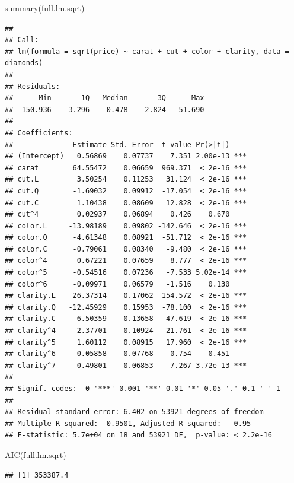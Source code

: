 \documentclass[
]{book}
\newenvironment{Shaded}{\begin{snugshade}}{\end{snugshade}}
\newcommand{\FunctionTok}[1]{\textcolor[rgb]{0.00,0.00,0.00}{#1}}
\newcommand{\NormalTok}[1]{#1}
\begin{document}
\begin{Shaded}
\begin{Highlighting}[]
\FunctionTok{summary}\NormalTok{(full.lm.sqrt)}
\end{Highlighting}
\end{Shaded}

\begin{verbatim}
## 
## Call:
## lm(formula = sqrt(price) ~ carat + cut + color + clarity, data = diamonds)
## 
## Residuals:
##      Min       1Q   Median       3Q      Max 
## -150.936   -3.296   -0.478    2.824   51.690 
## 
## Coefficients:
##              Estimate Std. Error  t value Pr(>|t|)    
## (Intercept)   0.56869    0.07737    7.351 2.00e-13 ***
## carat        64.55472    0.06659  969.371  < 2e-16 ***
## cut.L         3.50254    0.11253   31.124  < 2e-16 ***
## cut.Q        -1.69032    0.09912  -17.054  < 2e-16 ***
## cut.C         1.10438    0.08609   12.828  < 2e-16 ***
## cut^4         0.02937    0.06894    0.426    0.670    
## color.L     -13.98189    0.09802 -142.646  < 2e-16 ***
## color.Q      -4.61348    0.08921  -51.712  < 2e-16 ***
## color.C      -0.79061    0.08340   -9.480  < 2e-16 ***
## color^4       0.67221    0.07659    8.777  < 2e-16 ***
## color^5      -0.54516    0.07236   -7.533 5.02e-14 ***
## color^6      -0.09971    0.06579   -1.516    0.130    
## clarity.L    26.37314    0.17062  154.572  < 2e-16 ***
## clarity.Q   -12.45929    0.15953  -78.100  < 2e-16 ***
## clarity.C     6.50359    0.13658   47.619  < 2e-16 ***
## clarity^4    -2.37701    0.10924  -21.761  < 2e-16 ***
## clarity^5     1.60112    0.08915   17.960  < 2e-16 ***
## clarity^6     0.05858    0.07768    0.754    0.451    
## clarity^7     0.49801    0.06853    7.267 3.72e-13 ***
## ---
## Signif. codes:  0 '***' 0.001 '**' 0.01 '*' 0.05 '.' 0.1 ' ' 1
## 
## Residual standard error: 6.402 on 53921 degrees of freedom
## Multiple R-squared:  0.9501, Adjusted R-squared:   0.95 
## F-statistic: 5.7e+04 on 18 and 53921 DF,  p-value: < 2.2e-16
\end{verbatim}

\begin{Shaded}
\begin{Highlighting}[]
\FunctionTok{AIC}\NormalTok{(full.lm.sqrt)}
\end{Highlighting}
\end{Shaded}

\begin{verbatim}
## [1] 353387.4
\end{verbatim}
\end{document}
